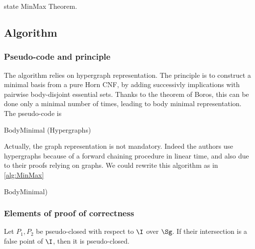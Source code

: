 state MinMax Theorem.

\subsection{Algorithm}
\subsubsection{Pseudo-code and principle}

The algorithm relies on hypergraph representation. The principle is to construct
a minimal basis from a pure Horn CNF, by adding successivly implications with 
pairwise body-disjoint essential sets. Thanks to the theorem of Boros, this can
be done only a minimal number of times, leading to body minimal representation.
The pseudo-code is 

\begin{algorithm}
	
\caption{BodyMinimal (Hypergraphs)}
\label{alg:MinMaxHyp}
\end{algorithm}

\noindent Actually, the graph representation is not mandatory. Indeed the 
authors use hypergraphs because of a forward chaining procedure in linear time,
and also due to their proofs relying on graphs. We could rewrite this algorithm
as in \ref{alg:MinMax}

\begin{algorithm}[H]


\caption{BodyMinimal)}
\label{alg:MinMax}
\end{algorithm}	

\subsubsection{Elements of proof of correctness}

\begin{proposition} Let $P_1, P_2$ be pseudo-closed with respect to $\I$ over 
$\Sg$. If their intersection is a false point of $\I$, then it is pseudo-closed.
	
\end{proposition}

